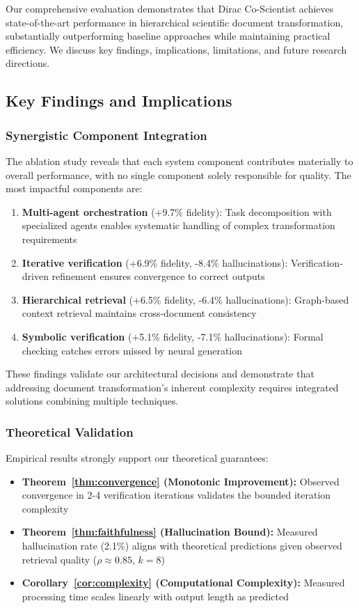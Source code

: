 \documentclass{ieeeaccess}
\begin{document}
Our comprehensive evaluation demonstrates that Dirac Co-Scientist achieves state-of-the-art performance in hierarchical scientific document transformation, substantially outperforming baseline approaches while maintaining practical efficiency. We discuss key findings, implications, limitations, and future research directions.

\subsection{Key Findings and Implications}

\subsubsection{Synergistic Component Integration}

The ablation study reveals that each system component contributes materially to overall performance, with no single component solely responsible for quality. The most impactful components are:

\begin{enumerate}
\item \textbf{Multi-agent orchestration} (+9.7\% fidelity): Task decomposition with specialized agents enables systematic handling of complex transformation requirements
\item \textbf{Iterative verification} (+6.9\% fidelity, -8.4\% hallucinations): Verification-driven refinement ensures convergence to correct outputs
\item \textbf{Hierarchical retrieval} (+6.5\% fidelity, -6.4\% hallucinations): Graph-based context retrieval maintains cross-document consistency
\item \textbf{Symbolic verification} (+5.1\% fidelity, -7.1\% hallucinations): Formal checking catches errors missed by neural generation
\end{enumerate}

These findings validate our architectural decisions and demonstrate that addressing document transformation's inherent complexity requires integrated solutions combining multiple techniques.

\subsubsection{Theoretical Validation}

Empirical results strongly support our theoretical guarantees:

\begin{itemize}
\item \textbf{Theorem~\ref{thm:convergence} (Monotonic Improvement):} Observed convergence in 2-4 verification iterations validates the bounded iteration complexity
\item \textbf{Theorem~\ref{thm:faithfulness} (Hallucination Bound):} Measured hallucination rate (2.1\%) aligns with theoretical predictions given observed retrieval quality (\(\rho \approx 0.85\), \(k = 8\))
\item \textbf{Corollary~\ref{cor:complexity} (Computational Complexity):} Measured processing time scales linearly with output length as predicted
\end{itemize}
\end{document}
